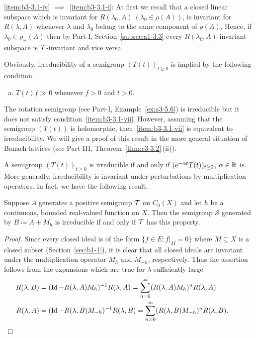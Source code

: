 \ref{item:b3-3.1-iv} $\implies$~\ref{item:b3-3.1-i}: At first we recall that a closed linear subspace which is invariant for $R(\lambda_0,A)\ (\lambda_0 \in \rho(A))$, is invariant for $R(\lambda ,A)$
whenever $\lambda$ and $\lambda_0$ belong to the same component of\/ $\rho(A)$. 
Hence, if\/ $\lambda_0 \in \rho_{+}(A)$ then by Part-I, Section~\ref{subsec:a1-3.3} every $R(\lambda_0,A)$-invariant subspace is $\mathcal{T}$-invariant and vice versa.
\begin{remark}\label{rem:b3-3.2}
	Obviously, irreducibility of a semigroup $(T(t))_{t\geq 0}$ is implied by the following condition.
\begin{enumerate}[(g)]	
\item\label{item:b3-3.1-vii}
$T(t)f \gg 0$ whenever $f > 0$ and $t > 0$.
\end{enumerate}
The rotation semigroup (see Part-I, Example~\ref{ex:a3-5.6}) is irreducible but it does not satisfy condition~\ref{item:b3-3.1-vii}.
	However, assuming that the semigroup $(T(t))$ is holomorphic, then~\ref{item:b3-3.1-vii}
	is equivalent to irreducibility.
	We will give a proof of this result in the more general situation of Banach lattices (see Part-III, Theorem~\ref{thm:c3-3.2}\,(ii)).
\end{remark}
A semigroup $(T(t))_{t  \geq 0}$ is irreducible if and only if\/ $(\eu^{-\alpha t}T(t))_{t  \geq 0}$, $\alpha \in \mathbb{R}$  is. 
More generally, irreducibility is invariant under perturbations by multiplication operators. 
In fact, we have the following result. 
\begin{proposition}\label{prop:b3-3.3}
%
	Suppose $A$ generates a positive semigroup $\mathcal{T}$ on $C_{0}(X)$ and let $h$ be a continuous, bounded real-valued function on $X$.
	Then the semigroup $\mathcal{S}$ generated by $B \coloneq A + M_{h}$ is irreducible if and only if\/ $\mathcal{T}$ has this property.
\end{proposition}
\begin{proof}
	Since every closed ideal is of the form $\{f \in E \colon f|_{M} = 0\}$ where $M \subseteq X$ is a closed subset (\cf Section~\ref{sec:b1-1}), it is clear that all closed ideals are invariant under the multiplication operator $M_{h}$ and $M_{-h}$, respectively.
	Thus the assertion follows from the expansions which are true for $\lambda$ sufficiently large
\begin{align*}
R(\lambda,B) &= (\Id - R(\lambda,A)M_{h})^{-1}R(\lambda,A) 
	= \sum_{n=0}^{\infty} (R(\lambda,A)M_{h})^{n}R(\lambda,A) \\
R(\lambda,A) &= (\Id - R(\lambda,B)M_{-h})^{-1}R(\lambda,B) = \sum_{n=0}^{\infty} (R(\lambda,B)M_{-h})^{n}R(\lambda,B).
\tag*{\qedsymbol}%
\end{align*} 
\let\qedsymbol\relax
\end{proof}

